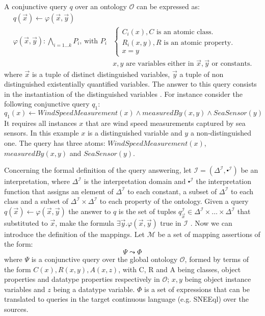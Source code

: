 A conjunctive query $q$ over an ontology $\mathcal{O}$ can be expressed as:
\begin{align*}
q(\vec{x}) \leftarrow \varphi(\vec{x},\vec{y}) \\
%
\varphi(\vec{x},\vec{y}):\underset{i=1...k}{\bigwedge}P_i \mbox{, with } P_i &\begin{cases} C_i(x),   C \mbox{ is an atomic class. } \\
  R_i(x,y),   R \mbox{ is an atomic property.}\\ x=y
\end{cases}
\\&x,y \mbox{ are variables either in $\vec{x}, \vec{y}$ or constants.}
\end{align*}
%
where $\vec{x}$ is a tuple of distinct distinguished variables, $\vec{y}$ a tuple of non distinguished existentially
quantified variables. The answer to this query consists in the instantiation of the distinguished variables
\cite{Calvanese_05}. For instance consider the following conjunctive query $q_1$:
\begin{equation*}
q_1(x) \leftarrow WindSpeedMeasurement(x)\wedge measuredBy(x,y)\wedge SeaSensor(y)
\end{equation*}
It requires all instances $x$ that are wind speed measurements captured by sea sensors. In this example $x$ is a distinguished variable and $y$ a non-distinguished one. The query has three atoms: $WindSpeedMeasurement(x)$, $measuredBy(x,y)$ and $SeaSensor(y)$.

Concerning the formal definition of the query answering, let $\mathcal{I}=(\Delta^\mathcal{I} ,\centerdot^\mathcal{I})$ be an interpretation, where $\Delta^\mathcal{I}$ is the interpretation domain and $\centerdot^\mathcal{I}$ the interpretation function that assigns an element of $\Delta^\mathcal{I}$ to each constant, a subset of $\Delta^\mathcal{I}$ to each class and a subset of $\Delta^\mathcal{I} \times \Delta^\mathcal{I}$ to each property of the ontology.
Given a query $q(\vec{x})\leftarrow \varphi(\vec{x},\vec{y})$ the answer to $q$ is the set of tuples $q^{\mathcal{I}}_{\vec{x}} \in \Delta^\mathcal{I} \times \dots \times \Delta^\mathcal{I}$ that substituted to $\vec{x}$, make the formula $\exists\vec{y}.\varphi(\vec{x},\vec{y})$ true in $\mathcal{I}$ \cite{Poggi_08,Lubyte_09}.
Now we can introduce the definition of the mappings. Let $\mathcal{M}$ be a set of mapping assertions of the form:
\begin{equation*}
\Psi \leadsto \Phi
\end{equation*}
where $\Psi$ is a conjunctive query over the global ontology $\mathcal{O}$, formed by terms of the form $C(x), R(x,y),
A(x,z)$, with C, R and A being classes, object properties and datatype properties respectively in $\mathcal{O}$; $x, y
$ being object instance variables and $z$ being a datatype variable. $\Phi$ is a set of expressions that can be
translated to queries in the target continuous language (e.g. SNEEql) over the sources.
\\

